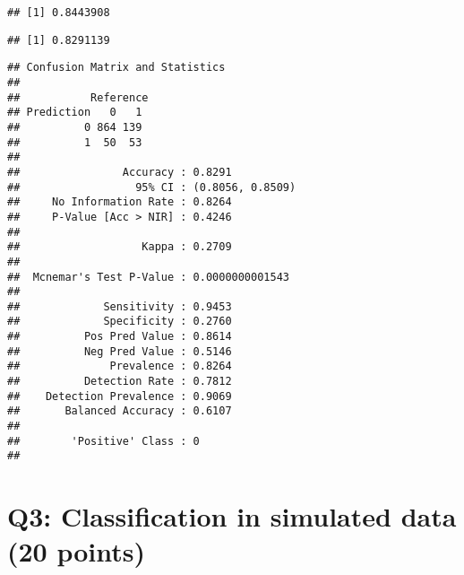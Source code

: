 \documentclass[]{article}
\newenvironment{Shaded}{\begin{snugshade}}{\end{snugshade}}
\newcommand{\DataTypeTok}[1]{\textcolor[rgb]{0.13,0.29,0.53}{#1}}
\newcommand{\KeywordTok}[1]{\textcolor[rgb]{0.13,0.29,0.53}{\textbf{#1}}}
\newcommand{\NormalTok}[1]{#1}
\newcommand{\OperatorTok}[1]{\textcolor[rgb]{0.81,0.36,0.00}{\textbf{#1}}}
\newcommand{\StringTok}[1]{\textcolor[rgb]{0.31,0.60,0.02}{#1}}
\begin{document}
\begin{verbatim}
## [1] 0.8443908
\end{verbatim}

\begin{Shaded}
\end{Shaded}

\begin{verbatim}
## [1] 0.8291139
\end{verbatim}

\begin{Shaded}
\end{Shaded}

\begin{verbatim}
## Confusion Matrix and Statistics
## 
##           Reference
## Prediction   0   1
##          0 864 139
##          1  50  53
##                                           
##                Accuracy : 0.8291          
##                  95% CI : (0.8056, 0.8509)
##     No Information Rate : 0.8264          
##     P-Value [Acc > NIR] : 0.4246          
##                                           
##                   Kappa : 0.2709          
##                                           
##  Mcnemar's Test P-Value : 0.0000000001543 
##                                           
##             Sensitivity : 0.9453          
##             Specificity : 0.2760          
##          Pos Pred Value : 0.8614          
##          Neg Pred Value : 0.5146          
##              Prevalence : 0.8264          
##          Detection Rate : 0.7812          
##    Detection Prevalence : 0.9069          
##       Balanced Accuracy : 0.6107          
##                                           
##        'Positive' Class : 0               
## 
\end{verbatim}

\hypertarget{q3-classification-in-simulated-data-20-points}{%
\section{\texorpdfstring{Q3: Classification in simulated data (20
points)}{Q3: Classification in simulated data (20 points)  }}\label{q3-classification-in-simulated-data-20-points}}
\end{document}
